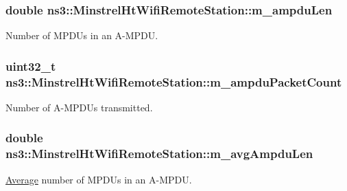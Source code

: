 \subsubsection[{\texorpdfstring{m\+\_\+ampdu\+Len}{m_ampduLen}}]{\setlength{\rightskip}{0pt plus 5cm}double ns3\+::\+Minstrel\+Ht\+Wifi\+Remote\+Station\+::m\+\_\+ampdu\+Len}\hypertarget{structns3_1_1MinstrelHtWifiRemoteStation_a201e968c04d1b28bc843004b1d436147}{}\label{structns3_1_1MinstrelHtWifiRemoteStation_a201e968c04d1b28bc843004b1d436147}


Number of M\+P\+D\+Us in an A-\/\+M\+P\+DU. 

\subsubsection[{\texorpdfstring{m\+\_\+ampdu\+Packet\+Count}{m_ampduPacketCount}}]{\setlength{\rightskip}{0pt plus 5cm}uint32\+\_\+t ns3\+::\+Minstrel\+Ht\+Wifi\+Remote\+Station\+::m\+\_\+ampdu\+Packet\+Count}\hypertarget{structns3_1_1MinstrelHtWifiRemoteStation_a1c341ba78d44c933fd4a13c6aef08eab}{}\label{structns3_1_1MinstrelHtWifiRemoteStation_a1c341ba78d44c933fd4a13c6aef08eab}


Number of A-\/\+M\+P\+D\+Us transmitted. 

\subsubsection[{\texorpdfstring{m\+\_\+avg\+Ampdu\+Len}{m_avgAmpduLen}}]{\setlength{\rightskip}{0pt plus 5cm}double ns3\+::\+Minstrel\+Ht\+Wifi\+Remote\+Station\+::m\+\_\+avg\+Ampdu\+Len}\hypertarget{structns3_1_1MinstrelHtWifiRemoteStation_a4c5bfea5207fe998326c535b3899b07f}{}\label{structns3_1_1MinstrelHtWifiRemoteStation_a4c5bfea5207fe998326c535b3899b07f}


\hyperlink{classns3_1_1Average}{Average} number of M\+P\+D\+Us in an A-\/\+M\+P\+DU. 

